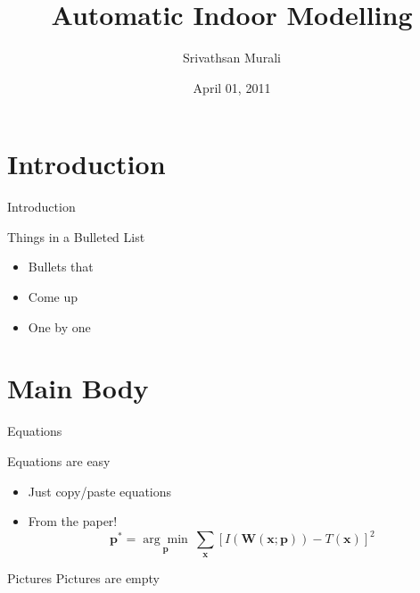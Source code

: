 \documentclass[xcolor=svgnames,handout]{beamer}
\title
  [Automatic Indoor Modelling\hspace{2em}]
  {Automatic Indoor Modelling}
\author
  [Srivathsan]
  {Srivathsan Murali}
\date
  {April 01, 2011}
\institute
  [CVG ETH]{Computer Vision and Geometry\\ETH Zurich}
\begin{document}
\maketitle

\section
  {Introduction}

\begin{frame}
  {Introduction}

  Things in a Bulleted List\pause

  \begin{itemize}
  \item Bullets that\pause
  \item Come up\pause
  \item One by one
  \end{itemize}
\end{frame}



\section{Main Body}

\begin{frame}
  {Equations}

  Equations are easy
  \begin{itemize}
  \item Just copy/paste equations\pause
  \item From the paper!
    \begin{equation*}
      \textbf{p}^* = \underset{\textbf{p}}{\arg\!\min}~\sum_{\textbf{x}}\left[ I(\textbf{W}(\textbf{x};\textbf{p})) - T(\textbf{x}) \right]^2
    \end{equation*}
  \end{itemize}
\end{frame}


\begin{frame}
  {Pictures}
  Pictures are empty

\end{frame}
\end{document}
